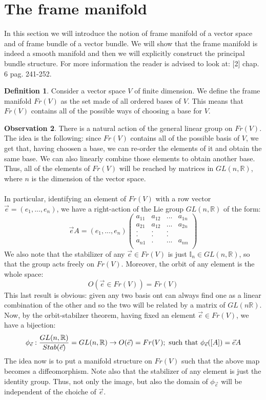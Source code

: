 \documentclass[12pt,a4paper]{report}
\theoremstyle{definition}
\newtheorem{Def}{Definition}[chapter]
\theoremstyle{Theorem}
\theoremstyle{definition}
\theoremstyle{definition}
\newtheorem{Obs}[Def]{Observation}
\begin{document}
		\section{The frame manifold}
		In this section we will introduce the notion of frame manifold of a vector space and of frame bundle of a vector bundle. We will show that the frame manifold is indeed a smooth manifold and then we will explicitly construct the principal bundle structure. For more information the reader is advised to look at: [2] chap. 6 pag. 241-252.
		\begin{Def}\label{Def_6.5}
			Consider a vector space $V$ of finite dimension. We define the frame manifold $Fr(V)$ as the set made of all ordered bases of $V$. This means that $Fr(V)$ contains all of the possible ways of choosing a base for $V$.
		\end{Def}
		\begin{Obs}
			There is a natural action of the general linear group on $Fr(V)$. The idea is the following: since $Fr(V)$ contains all of the possible basis of $V$, we get that, having choosen a base, we can re-order the elements of it and obtain the same base. We can also linearly combine those elements to obtain another base. Thus, all of the elements of $Fr(V)$ will be reached by matrices in $GL(n,\mathbb{R})$, where $n$ is the dimension of the vector space.\\
			\\
			In particular, identifying an element of $Fr(V)$ with a row vector $\vec{e}=(e_1,...,e_n)$, we have a right-action of the Lie group $GL(n,\mathbb{R})$ of the form:
			$$\vec{e}A=(e_1,...,e_n)\begin{pmatrix}
				a_{11}&a_{12}&...&a_{1n}\\
				a_{21}&a_{12}&...&a_{2n}\\
				.     &.     &.   &     \\
				.     &.     &.   &     \\
				a_{n1}&.     &...&a_{nn}\\
			\end{pmatrix}$$
			We also note that the stabilizer of any $\vec{e}\in Fr(V)$ is just $\mathbb{I}_n\in GL(n,\mathbb{R})$, so that the group acts freely on $Fr(V)$. Moreover, the orbit of any element is the whole space: 
			$$O(\vec{e}\in Fr(V))=Fr(V)$$
			This last result is obvious: given any two basis ont can always find one as a linear combination of the other and so the two will be related by a matrix of $GL(n\mathbb{R})$.
			Now, by the orbit-stabilzer theorem, having fixed an element $\vec{e}\in Fr(V)$, we have a bijection:
			$$\phi_{\vec{e}}:{GL(n,\mathbb{R})\over Stab(\vec{e})}=GL(n,\mathbb{R})\rightarrow O(\vec{e})=Fr(V);\hbox{ such that } \phi_{\vec{e}}([A])=\vec{e}A$$
			The idea now is to put a manifold structure on $Fr(V)$ such that the above map becomes a diffeomorphism. Note also that the stabilizer of any element is just the identity group. Thus, not only the image, but also the domain of $\phi_{\vec{e}}$ will be independent of the choiche of $\vec{e}$.
		\end{Obs}
\end{document}
